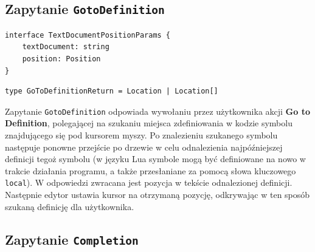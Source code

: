 \subsection{Zapytanie \texttt{GotoDefinition}}
\begin{lstlisting}[title=Struktura argumentu zapytania]
interface TextDocumentPositionParams {
    textDocument: string
    position: Position
}
\end{lstlisting}

\begin{lstlisting}[title=Struktura odpowiedzi]
type GoToDefinitionReturn = Location | Location[]
\end{lstlisting}
Zapytanie \texttt{GotoDefinition} odpowiada wywołaniu przez użytkownika akcji \textbf{Go to Definition}, polegającej na szukaniu miejsca zdefiniowania w kodzie symbolu znajdującego się pod kursorem myszy. Po znalezieniu szukanego symbolu następuje ponowne przejście po drzewie w celu odnalezienia najpóźniejszej definicji tegoż symbolu (w języku Lua symbole mogą być definiowane na nowo w trakcie działania programu, a także przesłaniane za pomocą słowa kluczowego \texttt{local}). W odpowiedzi zwracana jest pozycja w tekście odnalezionej definicji. Następnie edytor ustawia kursor na otrzymaną pozycję, odkrywając w ten sposób szukaną definicję dla użytkownika.

\subsection{Zapytanie \texttt{Completion}}

